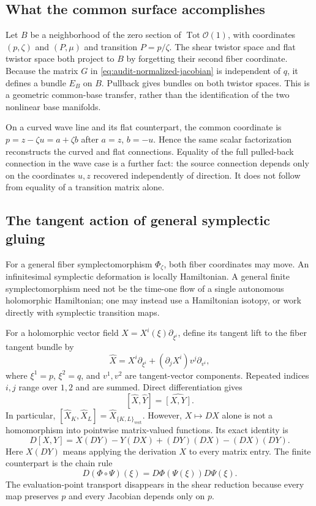\subsection{What the common surface accomplishes}

Let $B$ be a neighborhood of the zero section of $\operatorname{Tot}
\mathcal O(1)$, with coordinates $(p,\zeta)$ and $(P,\mu)$ and transition
$P=p/\zeta$. The shear twistor space and flat twistor space both project
to $B$ by forgetting their second fiber coordinate. Because the matrix
$G$ in \eqref{eq:audit-normalized-jacobian} is independent of $q$, it
defines a bundle $E_B$ on $B$. Pullback gives bundles on both twistor
spaces. This is a geometric common-base transfer, rather than the
identification of the two nonlinear base manifolds.

On a curved wave line and its flat counterpart, the common coordinate is
$p=z-\zeta u=a+\zeta b$ after $a=z$, $b=-u$. Hence the same scalar
factorization reconstructs the curved and flat connections. Equality
of the full pulled-back connection in the wave case is a further fact:
the source connection depends only on the coordinates $u,z$ recovered
independently of direction. It does not follow from equality of a
transition matrix alone.

\subsection{The tangent action of general symplectic gluing}

For a general fiber symplectomorphism $\Phi_\zeta$, both fiber coordinates
may move. An infinitesimal symplectic deformation is locally Hamiltonian.
A general finite symplectomorphism need not be the time-one flow of a
single autonomous holomorphic Hamiltonian; one may instead use a
Hamiltonian isotopy, or work directly with symplectic transition maps.

For a holomorphic vector field $X=X^i(\xi)\partial_{\xi^i}$, define its
tangent lift to the fiber tangent bundle by
\[
\widehat X
=X^i\partial_{\xi^i}
+(\partial_jX^i)v^j\partial_{v^i},
\]
where $\xi^1=p$, $\xi^2=q$, and $v^1,v^2$ are tangent-vector components.
Repeated indices $i,j$ range over $1,2$ and are summed. Direct
differentiation gives
\begin{equation}\label{eq:audit-tangent-lift-bracket}
[\widehat X,\widehat Y]=\widehat{[X,Y]}.
\end{equation}
In particular,
$[\widehat X_K,\widehat X_L]=\widehat X_{\{K,L\}_{\mathrm{vert}}}$.
However, $X\mapsto DX$ alone is not a homomorphism into pointwise
matrix-valued functions. Its exact identity is
\[
D[X,Y]=X(DY)-Y(DX)+(DY)(DX)-(DX)(DY).
\]
Here $X(DY)$ means applying the derivation $X$ to every matrix entry.
The finite counterpart is the chain rule
\begin{equation}\label{eq:audit-chain-rule}
D(\Phi\circ\Psi)(\xi)=D\Phi(\Psi(\xi))D\Psi(\xi).
\end{equation}
The evaluation-point transport disappears in the shear reduction because
every map preserves $p$ and every Jacobian depends only on $p$.

